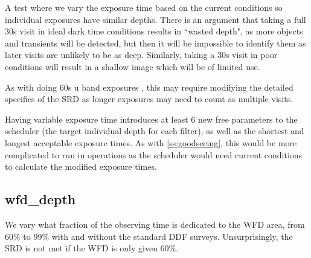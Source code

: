 A test where we vary the exposure time based on the current conditions so individual exposures have similar depths. There is an argument that taking a full 30s visit in ideal dark time conditions results in ``wasted depth", as more objects and transients will be detected, but then it will be impossible to identify them as later visits are unlikely to be as deep. Similarly, taking a 30s visit in poor conditions will result in a shallow image which will be of limited use.

As with doing 60s u band exposures , this may require modifying the detailed specifics of the SRD as longer exposures may need to count as multiple visits.

Having variable exposure time introduces at least 6 new free parameters to the scheduler (the target individual depth for each filter), as well as the shortest and longest acceptable exposure times.  As with \ref{ss:goodseeing}, this would be more complicated to run in operations as the scheduler would need current conditions to calculate the modified exposure times.

\subsection{wfd\_depth}

We vary what fraction of the observing time is dedicated to the WFD area, from 60\% to 99\% with and without the standard DDF surveys. Unsurprisingly, the SRD is not met if the WFD is only given 60\%.















